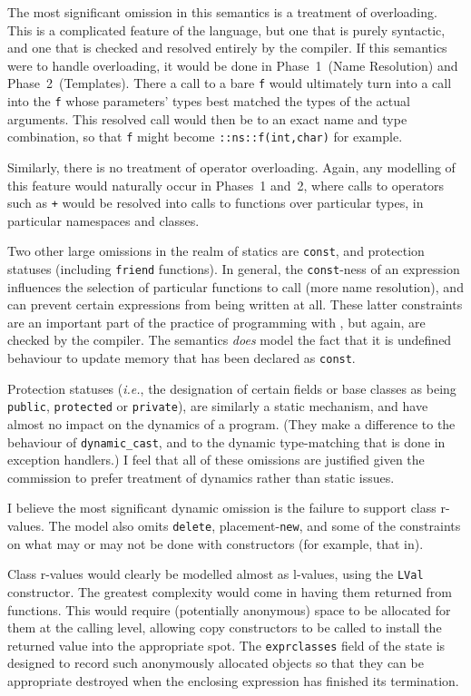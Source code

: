\documentclass[11pt]{article}
\newcommand{\ie}{\emph{i.e.}}
\begin{document}
 The most significant omission in this semantics is
a treatment of overloading.  This is a complicated feature of the
language, but one that is purely syntactic, and one that is checked
and resolved entirely by the compiler.  If this semantics were to
handle overloading, it would be done in Phase~1~(Name Resolution) and
Phase~2~(Templates).  There a call to a bare \texttt{f} would
ultimately turn into a call into the \texttt{f} whose parameters'
types best matched the types of the actual arguments.  This resolved
call would then be to an exact name and type combination, so that
\texttt{f} might become \texttt{::ns::f(int,char)} for example.

Similarly, there is no treatment of operator overloading.  Again, any
modelling of this feature would naturally occur in Phases~1 and~2,
where calls to operators such as \texttt{+} would be resolved into
calls to functions over particular types, in particular namespaces and
classes.

Two other large omissions in the realm of statics are \texttt{const},
and protection statuses (including \texttt{friend} functions).  In
general, the \texttt{const}-ness of an expression influences the
selection of particular functions to call (more name resolution), and
can prevent certain expressions from being written at all.  These
latter constraints are an important part of the practice of
programming with \cpp{}, but again, are checked by the compiler.  The
semantics \emph{does} model the fact that it is undefined behaviour to
update memory that has been declared as \texttt{const}.

Protection statuses (\ie, the designation of certain fields or base
classes as being \texttt{public}, \texttt{protected} or
\texttt{private}), are similarly a static mechanism, and have almost
no impact on the dynamics of a program.  (They make a difference to
the behaviour of \texttt{dynamic_cast}, and to the dynamic
type-matching that is done in exception handlers.)  I feel that all of
these omissions are justified given the commission to prefer treatment
of dynamics rather than static issues.

I believe the most significant dynamic omission is the failure to
support class r-values.  The model also omits \texttt{delete},
placement-\texttt{new}, and some of the constraints on what may or may
not be done with constructors (for example, that
in\cite[\S12.1,~para~15]{cpp-standard-iso14882}).

Class r-values would clearly be modelled almost as l-values, using the
\texttt{LVal} constructor.  The greatest
complexity would come in having them returned from functions.  This
would require (potentially anonymous) space to be allocated for them
at the calling level, allowing copy constructors to be called to
install the returned value into the appropriate spot.  The
\texttt{exprclasses}%
%
field of the state is designed to record such anonymously allocated
objects so that they can be appropriate destroyed when the enclosing
expression has finished its termination.
\end{document}
